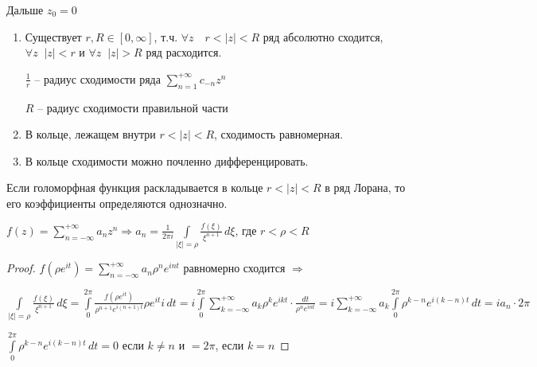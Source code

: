 Дальше $z_0 = 0$

\begin{properties}\thmslashn
	
	\begin{enumerate}
		\item 
		Существует $r, R \in [0, \infty]$, т.ч. $\forall z\quad r < |z| < R$ ряд абсолютно сходится, $\forall z\;\; |z| < r$ и $\forall z \;\; |z| > R$ ряд расходится.
	
		$\frac{1}{r}$ -- радиус сходимости ряда $\sum\limits_{n=1}^{+\infty} c_{-n}z^{n}$
		
		$R$ -- радиус сходимости правильной части
		
		\item
		В кольце, лежащем внутри $r < |z| < R$, сходимость равномерная.
		
		\item
		В кольце сходимости можно почленно дифференцировать.
	\end{enumerate}
	
\end{properties}

\begin{theorem}\thmslashn
	
	Если голоморфная функция раскладывается в кольце $r < |z| < R$ в ряд Лорана, то его коэффициенты определяются однозначно. 
	
	$f(z) = \sum\limits_{n=-\infty}^{+\infty} a_n z^n \Rightarrow a_n = \frac{1}{2\pi i} \int\limits_{|\xi| = \rho} \frac{f(\xi)}{\xi^{n+1}}\,d\xi$, где $r < \rho < R$
	
\end{theorem}

\begin{proof}\thmslashn
	
	$f(\rho e^{i t}) = \sum\limits_{n=-\infty}^{+\infty} a_n \rho^n e^{int}$ равномерно сходится $\Rightarrow$ 
	
	$ \int\limits_{|\xi| = \rho} \frac{f(\xi)}{\xi^{n+1}}\,d\xi =  \int\limits_{0}^{2\pi} \frac{f(\rho e^{i t})}{\rho^{n+1} e^{i(n+1)t}}\rho e^{it} i\,dt = i\int\limits_{0}^{2\pi} \sum\limits_{k = -\infty}^{+\infty}a_k \rho^k e^{ikt} \cdot \frac{dt}{\rho^{n}e^{int}} = i\sum\limits_{k = -\infty}^{+\infty}a_k \int\limits_{0}^{2\pi}\rho^{k-n} e^{i(k-n)t}\,dt = ia_n\cdot 2\pi$
	
	$\int\limits_{0}^{2\pi}\rho^{k-n} e^{i(k-n)t}\,dt = 0$ если $k\not = n$ и $ = 2\pi$, если $k = n$
	
\end{proof}

